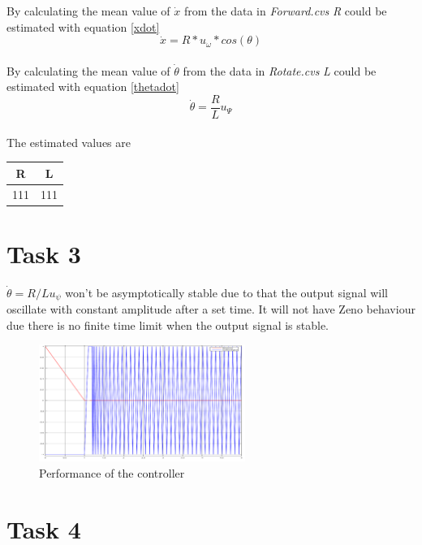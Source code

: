 \documentclass[a4paper,12pt,oneside,onecolumn]{article} %
\begin{document}
By calculating the mean value of $\dot{x}$ from the data in \emph{Forward.cvs} \emph{R} could be estimated with equation \eqref{xdot}
\begin{equation}
\dot{x} = R*u_\omega*cos(\theta) \label{xdot}
\end{equation}
\\
By calculating the mean value of $\dot{\theta}$ from the data in \emph{Rotate.cvs} \emph{L} could be estimated with equation \eqref{thetadot}
\begin{equation}
\dot{\theta} = \frac{R}{L}u_\Psi\label{thetadot}
\end{equation}
\\
The estimated values are
\begin{center}
	\begin{tabular}{| c | c |}
	\hline
	R & L \\ \hline
	111 & 111 \\ \hline
	
	\end{tabular}
\end{center}

\section*{Task 3}

$\dot{\theta} = R/L u_\psi$ won't be asymptotically stable due to that the output signal will oscillate with constant amplitude after a set time. It will not have Zeno behaviour due there is no finite time limit when the output signal is stable. 

\begin{figure}[H]
\begin{center}	
  \includegraphics[width = 0.6\textwidth]{rot1.png}
  \caption{Performance of the controller}
  
 \end{center}
\end{figure}


\section*{Task 4}
\end{document}
